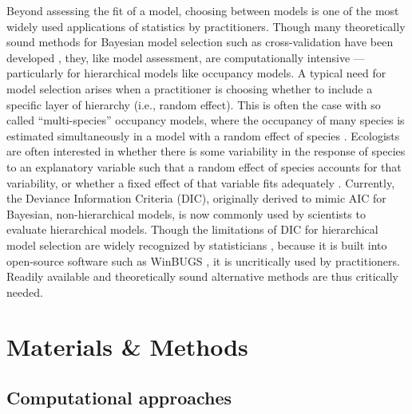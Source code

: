 \documentclass[12pt]{article}
\begin{document}
Beyond assessing the fit of a model, choosing between models is one of
the most widely used applications of statistics by
practitioners. Though many theoretically sound methods for Bayesian
model selection such as cross-validation have been developed
\citep{hooten2014guide}, they, like model assessment, are
computationally intensive --- particularly for hierarchical models
like occupancy models. A typical need for model selection arises when
a practitioner is choosing whether to include a specific layer of
hierarchy (i.e., random effect). This is often the case with so called
``multi-species'' occupancy models, where the occupancy of many
species is estimated simultaneously in a model with a random effect of
species \citep[reviewed in, ][]{iknayan2014detecting}. Ecologists are
often interested in whether there is some variability in the response
of species to an explanatory variable such that a random effect of
species accounts for that variability, or whether a fixed effect of
that variable fits adequately
\citep{pacifici2014guidelines}. Currently, the Deviance Information
Criteria (DIC), originally derived to mimic AIC for Bayesian,
non-hierarchical models, is now commonly used by scientists to
evaluate hierarchical models. Though the limitations of DIC for
hierarchical model selection are widely recognized by statisticians
\citep{celeux2006deviance, hooten2014guide}, because it is built into
open-source software such as WinBUGS \citep{winbugs}, it is
uncritically used by practitioners. Readily available and
theoretically sound alternative methods are thus critically needed.






\section*{Materials \& Methods}
\label{sec:methods}
\subsection*{Computational approaches}
\end{document}

